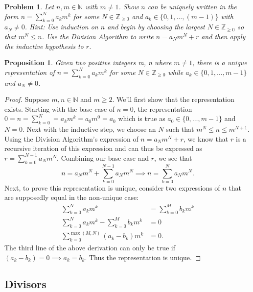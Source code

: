 \documentclass[12pt]{article}
\newtheorem*{prop}{Proposition}
\newtheorem{problem}{Problem}
\theoremstyle{remark}  %
\begin{document}
\setcounter{problem}{9}
    \begin{problem}
        Let $n,m\in \mathbb{N}$ with $m\neq 1$. Show $n$ can be uniquely written in the form $n=\sum_{k=0}^{N}a_km^k$ for some $N\in\mathbb{Z}_{\geq 0}$ and $a_k\in\{0,1,\dots,(m-1)\}$ with $a_N\neq0$. Hint: Use induction on $n$ and begin by choosing the largest $N\in \mathbb{Z}_{\geq 0}$ so that $m^N\leq n$. Use the Division Algorithm to write $n=a_Nm^N+r$ and then apply the inductive hypothesis to $r$.
    \end{problem}
    \begin{prop}
        Given two positive integers m, n where $m\neq 1$, there is a unique representation of $n=\sum_{k=0}^{N}a_km^k$ for some $N\in \mathbb{Z}_{\geq 0}$ while $a_k\in \{0,1,\dots,m-1\}$ and $a_N\neq 0$.
    \end{prop}
    \begin{proof}
        Suppose $m,n \in\mathbb{N}$ and $m\geq 2$. We'll first show that the representation exists. Starting with the base case of $n=0$, the representation $0=n=\sum_{k=0}^{N}=a_km^k=a_0m^0=a_0$ which is true as $a_0\in\{0,\dots,m-1\}$ and $N=0$. Next with the inductive step, we choose an $N$ such that $m^N\leq n \leq m^{N+1}$. Using the Division Algorithm's expression of $n=a_Nm^N+r$, we know that $r$ is a recursive iteration of this expression and can thus be expressed as $r=\sum_{k=0}^{N-1}a_Nm^N$. Combining our base case and $r$, we see that $$n=a_Nm^N+\sum_{k=0}^{N-1}a_Nm^N\implies n=\sum_{k=0}^{N}a_Nm^N.$$ Next, to prove this representation is unique, consider two expressions of $n$ that are supposedly equal in the non-unique case:
        \begin{align*}
            \sum_{k=0}^{N}a_km^k &= \sum_{k=0}^{M}b_km^k \\
            \sum_{k=0}^{N}a_km^k-\sum_{k=0}^{M}b_km^k &=0 \\
            \sum_{k=0}^{\max(M,N)}(a_k-b_k)m^k &= 0.
        \end{align*}
        The third line of the above derivation can only be true if $(a_k-b_k)=0\implies a_k=b_k$. Thus the representation is unique.
    \end{proof}
\vspace{.5em}

\subsection{Divisors}
\end{document}
